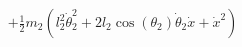 \documentclass[preview]{standalone}
\begin{document}
\begin{align*}
+ \frac{1}{2} m_{2} \left(l_{2}^{2} \dot{\theta}_{2}^{2} + 2 l_{2} \operatorname{cos}\left(\theta_{2}\right) \dot{\theta}_{2} \dot{x} + \dot{x}^{2}\right)
\end{align*}
\end{document}
